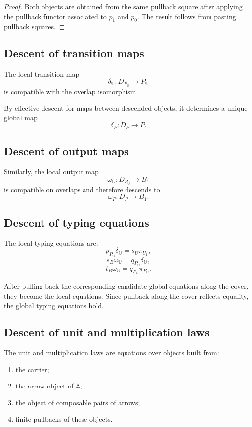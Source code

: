 \begin{proof}
Both objects are obtained from the same pullback square after applying the
pullback functor associated to \(p_1\) and \(p_0\). The result follows from
pasting pullback squares.
\end{proof}

\subsection{Descent of transition maps}
\label{subsec:descent-transition-maps}

The local transition map
\[
    \delta_{\mathbb U}:
    D_{P_{\mathbb U}}
    \to
    P_{\mathbb U}
\]
is compatible with the overlap isomorphism.

By effective descent for maps between descended objects, it determines a
unique global map
\[
    \delta_P:D_P\to P.
\]

\subsection{Descent of output maps}
\label{subsec:descent-output-maps}

Similarly, the local output map
\[
    \omega_{\mathbb U}:
    D_{P_{\mathbb U}}
    \to
    B_1
\]
is compatible on overlaps and therefore descends to
\[
    \omega_P:D_P\to B_1.
\]

\subsection{Descent of typing equations}
\label{subsec:descent-typing-equations}

The local typing equations are:
\[
    p_{P_{\mathbb U}}\delta_{\mathbb U}
    =
    s_U\pi_{U_1},
\]
\[
    s_B\omega_{\mathbb U}
    =
    q_{P_{\mathbb U}}\delta_{\mathbb U},
\]
\[
    t_B\omega_{\mathbb U}
    =
    q_{P_{\mathbb U}}\pi_{P_{\mathbb U}}.
\]

After pulling back the corresponding candidate global equations along the
cover, they become the local equations. Since pullback along the cover
reflects equality, the global typing equations hold.

\subsection{Descent of unit and multiplication laws}
\label{subsec:descent-unit-multiplication}

The unit and multiplication laws are equations over objects built from:
\begin{enumerate}
    \item the carrier;
    \item the arrow object of \(\mathbb A\);
    \item the object of composable pairs of arrows;
    \item finite pullbacks of these objects.
\end{enumerate}

